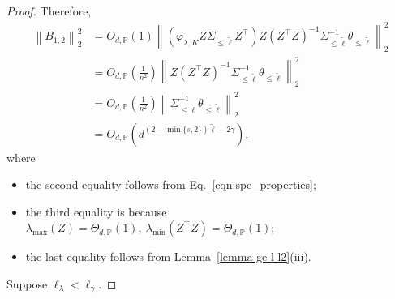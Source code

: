 \documentclass{article}
\theoremstyle{plain}
\theoremstyle{definition}
\theoremstyle{remark}
\begin{document}
\begin{appendix}
\begin{proof}
Therefore,
\begin{equation}\label{eqn_bound_b_12}
\begin{aligned}
\left\| B_{1, 2} \right\|_{2}^{2}
&= O_{d, \mathbb{P}}\left(1\right)
\left\|
\left(\varphi_{\lambda, K} 
Z\Sigma_{\leq \tilde{\ell}}
Z^{\top}\right)
Z\left(Z^\top Z\right)^{-1}
\Sigma_{\leq \tilde{\ell}}^{-1}\theta_{\leq \tilde{\ell}}
\right\|_{2}^{2} \\
&= O_{d, \mathbb{P}}\left(\frac{1}{n^2}\right)
\left\|
Z\left(Z^\top Z\right)^{-1}
\Sigma_{\leq \tilde{\ell}}^{-1}\theta_{\leq \tilde{\ell}}
\right\|_{2}^{2} \\
&= O_{d, \mathbb{P}}\left(\frac{1}{n^2}\right)
\left\|
\Sigma_{\leq \tilde{\ell}}^{-1}\theta_{\leq \tilde{\ell}}
\right\|_{2}^{2} \\
&= O_{d, \mathbb{P}}\left( d^{(2-\min\{s, 2\})\tilde{\ell}-2\gamma }\right),
\end{aligned}
\end{equation}
where 
\begin{itemize}
    \item the second equality follows from Eq.~\eqref{eqn:spe_properties};
    \item the third equality is because 
$
\lambda_{\max}(Z)=\Theta_{d,\mathbb{P}}(1),
~\lambda_{\min}(Z^{\top}Z)=\Theta_{d,\mathbb{P}}(1)$; 
\item the last equality follows from Lemma~\ref{lemma ge l l2}(iii).
\end{itemize} 





Suppose $\ell_\lambda < \ell_{\gamma}$. 


\end{proof}
\end{appendix}
\end{document}

